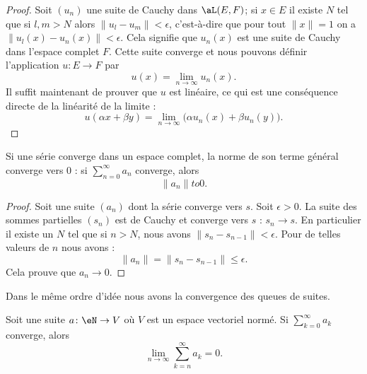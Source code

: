 \begin{proof}
	Soit \( (u_n)\) une suite de Cauchy dans \( \aL(E,F)\); si \( x\in E\) il existe \( N\) tel que si \( l,m>N\) alors \( \| u_l-u_m \|<\epsilon\), c'est-à-dire que pour tout \( \| x \|=1\) on a \( \| u_l(x)-u_n(x) \|<\epsilon\). Cela signifie que \( u_n(x)\) est une suite de Cauchy dans l'espace complet \( F\). Cette suite converge et nous pouvons définir l'application \( u\colon E\to F\) par
	\begin{equation}
		u(x)=\lim_{n\to \infty} u_n(x).
	\end{equation}
	Il suffit maintenant de prouver que \( u\) est linéaire, ce qui est une conséquence directe de la linéarité de la limite :
	\begin{equation}
		u(\alpha x+\beta y)=\lim_{n\to \infty} \big( \alpha u_n(x)+\beta u_n(y) \big).
	\end{equation}
\end{proof}

\begin{proposition}  \label{PROPooYDFUooTGnYQg}
	Si une série converge dans un espace complet, la norme de son terme général converge vers \( 0\) : si \( \sum_{n=0}^{\infty}a_n\) converge, alors
	\begin{equation}
		\| a_n \|to 0.
	\end{equation}
\end{proposition}

\begin{proof}
	Soit une suite \( (a_n)\) dont la série converge vers \( s\). Soit \( \epsilon>0\). La suite des sommes partielles \( (s_n)\) est de Cauchy et converge vers \( s\) : \( s_n\to s\). En particulier il existe un \( N\) tel que si \( n>N\), nous avons \( \| s_n-s_{n-1} \|<\epsilon\). Pour de telles valeurs de \( n\) nous avons :
	\begin{equation}
		\| a_n \|=\| s_n-s_{n-1} \|\leq \epsilon.
	\end{equation}
	Cela prouve que \( a_n\to 0\).
\end{proof}

Dans le même ordre d'idée nous avons la convergence des queues de suites.

\begin{lemma}       \label{LEMooFUCOooCOqLRj}
	Soit une suite \( a\colon \eN\to V\) où \( V\) est un espace vectoriel normé. Si \( \sum_{k=0}^{\infty}a_k\) converge, alors
	\begin{equation}
		\lim_{n\to \infty} \sum_{k=n}^{\infty}a_k=0.
	\end{equation}
\end{lemma}

